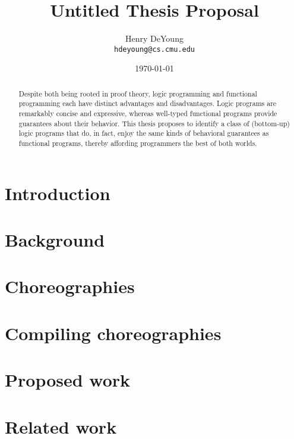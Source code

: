 \documentclass{article}
\begin{document}
\title{Untitled Thesis Proposal}
\author{Henry DeYoung\\\texttt{hdeyoung@cs.cmu.edu}}
\date{\today}
\maketitle

\begin{abstract}
  Despite both being rooted in proof theory, logic programming and functional programming each have distinct advantages and disadvantages.
  Logic programs are remarkably concise and expressive, whereas well-typed functional programs provide guarantees about their behavior.
  This thesis proposes to identify a class of (bottom-up) logic programs that do, in fact, enjoy the same kinds of behavioral guarantees as functional programs, thereby affording programmers the best of both worlds.
\end{abstract}

\section{Introduction}\label{sec:introduction}



\section{Background}\label{sec:background}



\section{Choreographies}\label{sec:choreographies}



\section{Compiling choreographies}\label{sec:compile-choreo}



\section{Proposed work}\label{sec:extensions}



\section{Related work}\label{sec:related-work}



\printbibliography
\end{document}
